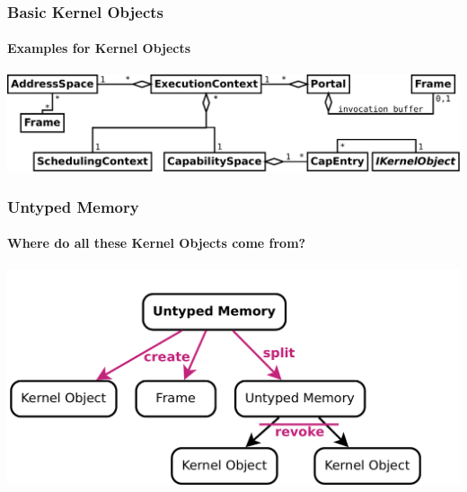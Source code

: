 \documentclass[9pt]{beamer}
\begin{document}
\begin{frame}
  \frametitle{Basic Kernel Objects}
  \framesubtitle{Examples for Kernel Objects}
  \begin{center}
  \includegraphics[width=\textwidth]{../fig/kernel-objects-logical.pdf}
  \end{center}
\end{frame}


\begin{frame}
  \frametitle{Untyped Memory}
  \framesubtitle{Where do all these Kernel Objects come from?}
  \includegraphics[width=\textwidth]{figures/um-ops.pdf}
\end{frame}
\end{document}
